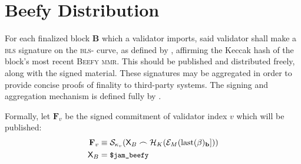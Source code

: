 \section{Beefy Distribution}\label{sec:beefy}

For each finalized block $\mathbf{B}$ which a validator imports, said validator shall make a \textsc{bls} signature on the \textsc{bls}- curve, as defined by \cite{bls12-381}, affirming the Keccak hash of the block's most recent \textsc{Beefy} \textsc{mmr}. This should be published and distributed freely, along with the signed material. These signatures may be aggregated in order to provide concise proofs of finality to third-party systems. The signing and aggregation mechanism is defined fully by \cite{cryptoeprint:2022/1611}.

Formally, let $\mathbf{F}_v$ be the signed commitment of validator index $v$ which will be published:
\begin{align}\label{eq:beefysignedcommitment}
  \mathbf{F}_v &\equiv \mathcal{S}_{\kappa_v}(\mathsf{X}_B\frown\mathcal{H}_K(\mathcal{E}_M(\text{last}(\beta)_\mathbf{b}]))\\
  \mathsf{X}_B &= \text{{\small \texttt{\$jam\_beefy}}}
\end{align}
